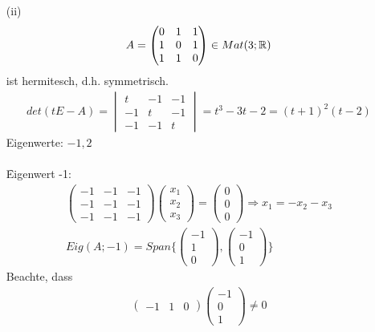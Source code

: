 \begin{itemize}
\item[(ii)]
\begin{align}
A = \begin{pmatrix} 0 & 1 & 1 \\ 1 & 0 & 1 \\ 1 & 1 & 0 \end{pmatrix} \in Mat(3; \mathbb{R})
\end{align}
ist hermitesch, d.h. symmetrisch.
\begin{align}
det(t E - A) = \begin{vmatrix} t & -1 & -1 \\ -1 & t & -1 \\ -1 & -1 & t \end{vmatrix} = t^3 - 3t -2 = (t+1)^2 (t-2)
\end{align}
Eigenwerte: $-1, 2$ \\\\
\f{Eigenwert -1}:
\begin{align}
\begin{pmatrix} -1 & -1 & -1 \\ -1 & -1 & -1 \\ -1 & -1 & -1 \end{pmatrix} \begin{pmatrix} x_1 \\ x_2 \\ x_3 \end{pmatrix} = \begin{pmatrix} 0 \\ 0 \\ 0 \end{pmatrix} \Rightarrow x_1 = - x_2 - x_3 \\
Eig(A; -1) = Span \{ \begin{pmatrix} -1 \\ 1 \\ 0 \end{pmatrix}, \begin{pmatrix} -1 \\ 0 \\ 1 \end{pmatrix} \}
\end{align}
Beachte, dass
\begin{align}
\begin{pmatrix} -1 & 1 & 0 \end{pmatrix} \begin{pmatrix} -1 \\ 0 \\ 1 \end{pmatrix} \neq 0

\end{align}
\end{itemize}
